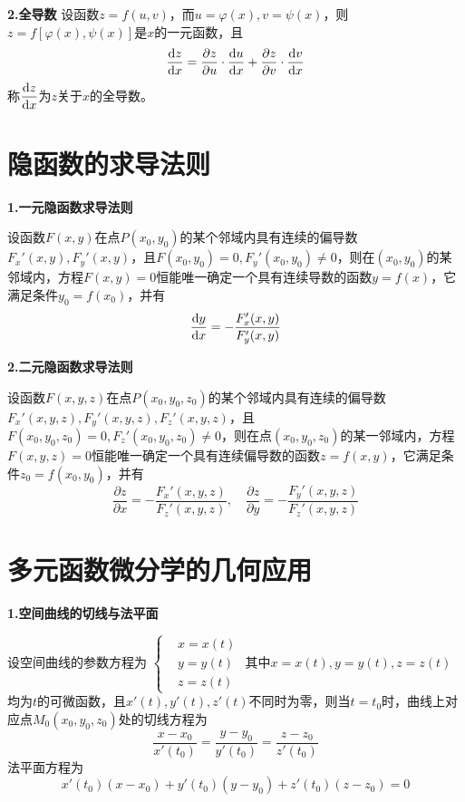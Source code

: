 \textbf{2.全导数}
设函数$z=f(u,v)$，而$u=\varphi(x),v=\psi(x)$，则$z=f[\varphi(x),\psi(x)]$是$x$的一元函数，且
\begin{equation*}
    \dfrac{\mathrm{d} z}{\mathrm{d} x}=\dfrac{\partial z}{\partial u}\cdot\dfrac{\mathrm{d} u}{\mathrm{d} x}+\dfrac{\partial z}{\partial v}\cdot\dfrac{\mathrm{d} v}{\mathrm{d} x}
\end{equation*}
称$\dfrac{\mathrm{d} z}{\mathrm{d} x}$为$z$关于$x$的全导数。

\section{隐函数的求导法则}
\textbf{1.一元隐函数求导法则}

设函数$F(x,y)$在点$P(x_0,y_0)$的某个邻域内具有连续的偏导数$F_x'(x,y),F_y'(x,y)$，且$F(x_0,y_0)=0,F_y'(x_0,y_0)\neq 0$，则在$(x_0,y_0)$的某邻域内，方程$F(x,y)=0$恒能唯一确定一个具有连续导数的函数$y=f(x)$，它满足条件$y_0=f(x_0)$，并有
\begin{equation*}
    \dfrac{\mathrm{d} y}{\mathrm{d} x}=-\dfrac{F_x'(x,y)}{F_y'(x,y)}
\end{equation*}

\textbf{2.二元隐函数求导法则}

设函数$F(x,y,z)$在点$P(x_0,y_0,z_0)$的某个邻域内具有连续的偏导数$F_x'(x,y,z),F_y'(x,y,z),F_z'(x,y,z)$，且\\$F(x_0,y_0,z_0)=0,F_z'(x_0,y_0,z_0)\neq 0$，则在点$(x_0,y_0,z_0)$的某一邻域内，方程$F(x,y,z)=0$恒能唯一确定一个具有连续偏导数的函数$z=f(x,y)$，它满足条件$z_0=f(x_0,y_0)$，并有
\begin{equation*}
    \dfrac{\partial z}{\partial x}=-\dfrac{F_x'(x,y,z)}{F_z'(x,y,z)}, \quad
    \dfrac{\partial z}{\partial y}=-\dfrac{F_y'(x,y,z)}{F_z'(x,y,z)}
\end{equation*}

\section{多元函数微分学的几何应用}
\textbf{1.空间曲线的切线与法平面}

设空间曲线的参数方程为 \quad $\left\{\begin{aligned} & x = x(t) \\ & y = y(t) \\ & z = z(t) \end{aligned}\right.$
其中$x=x(t),y=y(t),z=z(t)$均为$t$的可微函数，且$x'(t),y'(t),z'(t)$不同时为零，则当$t=t_0$时，曲线上对应点$M_0(x_0,y_0,z_0)$处的切线方程为
\begin{equation*}
    \dfrac{x-x_0}{x'(t_0)}=\dfrac{y-y_0}{y'(t_0)}=\dfrac{z-z_0}{z'(t_0)}
\end{equation*}
法平面方程为
\begin{equation*}
    x'(t_0)(x-x_0)+y'(t_0)(y-y_0)+z'(t_0)(z-z_0)=0
\end{equation*}

